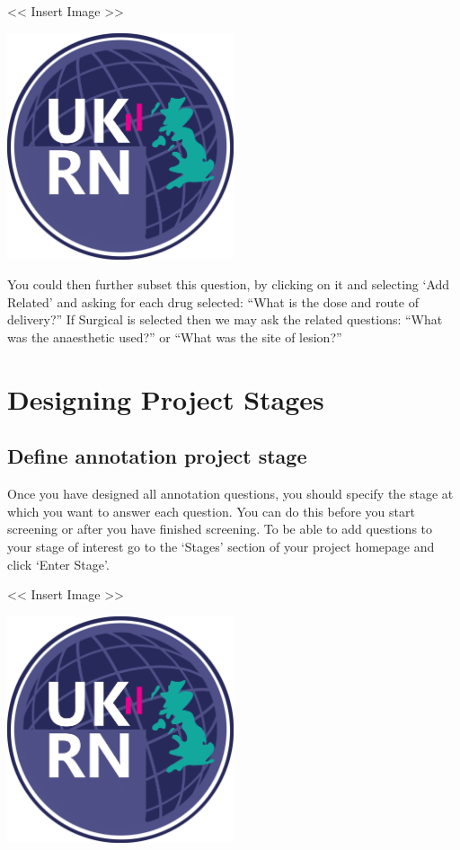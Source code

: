 \documentclass[]{book}
\begin{document}
\textless{}\textless{} Insert Image \textgreater{}\textgreater{}

\includegraphics[width=0.50000\textwidth,height=0.50000\textwidth]{figs/evidence-triangle.png}

You could then further subset this question, by clicking on it and
selecting `Add Related' and asking for each drug selected: ``What is the
dose and route of delivery?'' If Surgical is selected then we may ask
the related questions: ``What was the anaesthetic used?'' or ``What was
the site of lesion?''

\chapter{Designing Project Stages}\label{stages}

\section{Define annotation project
stage}\label{define-annotation-project-stage}

Once you have designed all annotation questions, you should specify the
stage at which you want to answer each question. You can do this before
you start screening or after you have finished screening. To be able to
add questions to your stage of interest go to the `Stages' section of
your project homepage and click `Enter Stage'.

\textless{}\textless{} Insert Image \textgreater{}\textgreater{}

\includegraphics[width=0.50000\textwidth,height=0.50000\textwidth]{figs/evidence-triangle.png}
\end{document}

